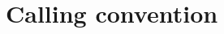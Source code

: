 \documentclass[sigplan,10pt,review]{acmart}
\newcommand{\kw}[1]{\ensuremath{ \mathsf{#1} }}
\begin{document}
%
%



\section{Calling convention} \label{sec:callconv} %

\end{document}
